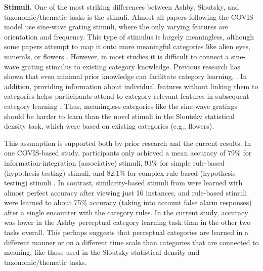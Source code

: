 \documentclass[../dissertation.tex]{subfiles}
\begin{document}
\textbf{Stimuli.} One of the most striking differences between Ashby, Sloutsky, and taxonomic/thematic tasks is the stimuli. Almost all papers following the COVIS model use sine-wave grating stimuli, where the only varying features are orientation and frequency. This type of stimulus is largely meaningless, although some papers attempt to map it onto more meaningful categories like alien eyes, minerals, or flowers \citep{Tolins2015, Perry2015}. However, in most studies it is difficult to connect a sine-wave grating stimulus to existing category knowledge. Previous research has shown that even minimal prior knowledge can facilitate category learning, \citep{Kaplan2000}. In addition, providing information about individual features without linking them to categories helps participants attend to category-relevant features in subsequent category learning \citep{Kim2011}. Thus, meaningless categories like the sine-wave gratings should be harder to learn than the novel stimuli in the Sloutsky statistical density task, which were based on existing categories (e.g., flowers). \par
	This assumption is supported both by prior research and the current results. In one COVIS-based study, participants only achieved a mean accuracy of 79\% for information-integration (associative) stimuli, 93\% for simple rule-based (hypothesis-testing) stimuli, and 82.1\% for complex rule-based (hypothesis-testing) stimuli \citep{Helie2010}. In contrast, similarity-based stimuli from \citet{Kloos2008} were learned with almost perfect accuracy after viewing just 16 instances, and rule-based stimuli were learned to about 75\% accuracy (taking into account false alarm responses) after a single encounter with the category rules. In the current study, accuracy was lower in the Ashby perceptual category learning task than in the other two tasks overall. This perhaps suggests that perceptual categories are learned in a different manner or on a different time scale than categories that are connected to meaning, like those used in the Sloutsky statistical density and taxonomic/thematic tasks. \par
\end{document}

